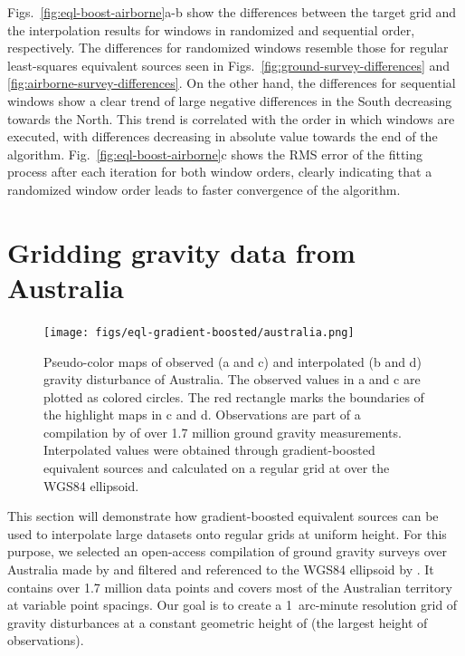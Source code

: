 Figs.~\ref{fig:eql-boost-airborne}a-b show the differences between the target
grid and the interpolation results for windows in randomized and sequential
order, respectively.
The differences for randomized windows resemble those for regular least-squares
equivalent sources seen in Figs.~\ref{fig:ground-survey-differences} and
\ref{fig:airborne-survey-differences}.
On the other hand, the differences for sequential windows show a clear
trend of large negative differences in the South decreasing towards the North.
This trend is correlated with the order in which windows are executed, with
differences decreasing in absolute value towards the end of the algorithm.
Fig.~\ref{fig:eql-boost-airborne}c shows the RMS error of the fitting process
after each iteration for both window orders, clearly indicating that
a randomized window order leads to faster convergence of the algorithm.



\section{Gridding gravity data from Australia}

\begin{figure}[p]
    \texttt{[image: figs/eql-gradient-boosted/australia.png]}
    \caption{
      Pseudo-color maps of observed (a and c) and
      interpolated (b and d) gravity disturbance of Australia.
      The observed values in a and c are plotted as colored circles.
      The red rectangle marks the boundaries of the highlight maps in c
      and d.
      Observations are part of a compilation by \citet{wynne2018} of
      over 1.7 million ground gravity measurements.
      Interpolated values were obtained through gradient-boosted equivalent
      sources and calculated on a regular grid at \AustraliaEqlGridHeight{}
      over the WGS84 ellipsoid.
    }
    \label{fig:australia}
\end{figure}

This section will demonstrate how gradient-boosted equivalent sources can be
used to interpolate large datasets onto regular grids at uniform height.
For this purpose, we selected an open-access compilation of ground gravity
surveys over Australia made by \citet{wynne2018} and filtered and referenced to
the WGS84 ellipsoid by \citet{australia_compilation}.
It contains over 1.7 million data points and covers most of the Australian
territory at variable point spacings.
Our goal is to create a 1~arc-minute resolution grid of gravity disturbances at
a constant geometric height of \AustraliaEqlGridHeight{} (the largest height of
observations).

